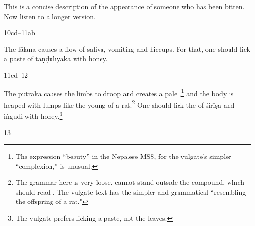 \begin{translation}
This is a concise description of the appearance of someone who has been 
bitten.  Now listen to a longer version. 

\item[10cd--11ab]

The \Gls{lālana} causes a flow of saliva, vomiting and hiccups.  For that, one 
should lick a paste of \gls{taṇḍulīyaka} with honey. 

\item [11cd--12]

The \Gls{putraka} causes the limbs to droop and creates a pale 
,\footnote{The expression  “beauty” in the 
Nepalese MSS, for the vulgate's simpler  “complexion,” is 
unusual.} and the body is heaped with lumps like the young of a 
rat.\footnote{The grammar here is very loose.  cannot stand 
outside the compound, which should read .  The 
vulgate text has the simpler and grammatical  
“resembling the offspring of a rat."}  One should lick the  of 
\gls{śirīṣa} and \gls{iṅgudi} with honey.\footnote{The vulgate prefers 
licking a paste, not the leaves.}

\item [13]




    \end{translation}
\endinput




%

